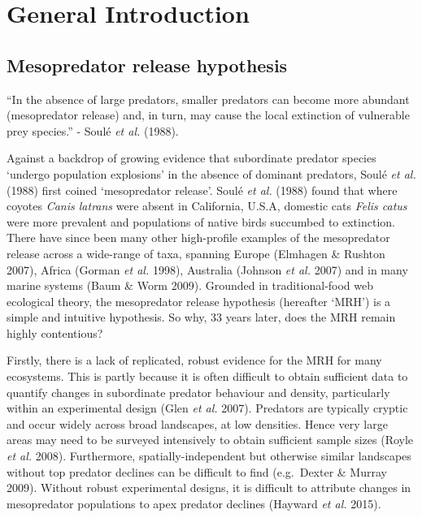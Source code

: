 \documentclass[11pt,a4paper,titlepage,twoside,openright]{style/unimelbthesis}
\begin{document}
\begin{mainmatter}

\hypertarget{general-introduction}{%
\chapter{General Introduction}\label{general-introduction}}

\hypertarget{mesopredator-release-hypothesis}{%
\section{Mesopredator release hypothesis}\label{mesopredator-release-hypothesis}}

``In the absence of large predators, smaller predators can become more abundant (mesopredator release) and, in turn, may cause the local extinction of vulnerable prey species.'' - Soulé \emph{et al.} (1988).

Against a backdrop of growing evidence that subordinate predator species `undergo population explosions' in the absence of dominant predators, Soulé \emph{et al.} (1988) first coined `mesopredator release'. Soulé \emph{et al.} (1988) found that where coyotes \emph{Canis latrans} were absent in California, U.S.A, domestic cats \emph{Felis catus} were more prevalent and populations of native birds succumbed to extinction. There have since been many other high-profile examples of the mesopredator release across a wide-range of taxa, spanning Europe (Elmhagen \& Rushton 2007), Africa (Gorman \emph{et al.} 1998), Australia (Johnson \emph{et al.} 2007) and in many marine systems (Baum \& Worm 2009). Grounded in traditional-food web ecological theory, the mesopredator release hypothesis (hereafter `MRH') is a simple and intuitive hypothesis. So why, 33 years later, does the MRH remain highly contentious?

Firstly, there is a lack of replicated, robust evidence for the MRH for many ecosystems. This is partly because it is often difficult to obtain sufficient data to quantify changes in subordinate predator behaviour and density, particularly within an experimental design (Glen \emph{et al.} 2007). Predators are typically cryptic and occur widely across broad landscapes, at low densities. Hence very large areas may need to be surveyed intensively to obtain sufficient sample sizes (Royle \emph{et al.} 2008). Furthermore, spatially-independent but otherwise similar landscapes without top predator declines can be difficult to find (e.g.~Dexter \& Murray 2009). Without robust experimental designs, it is difficult to attribute changes in mesopredator populations to apex predator declines (Hayward \emph{et al.} 2015).


\end{mainmatter}
\end{document}
